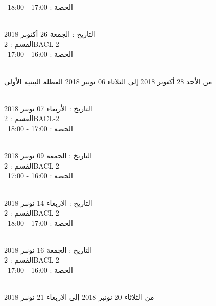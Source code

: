  \  
الحصة : 17:00 - 18:00 \\
\par
\noindent\makebox[\linewidth]{\rule{\paperwidth}{0.4pt}}
 \\
التاريخ : الجمعة 26 أكتوبر 2018 \\
القسم : 2BACL-2 \\
 \  
الحصة : 16:00 - 17:00 \\
\par
\noindent\makebox[\linewidth]{\rule{\paperwidth}{0.4pt}}
 \\
من الأحد 28 أكتوبر 2018 إلى الثلاثاء 06 نونبر 2018
\newline
\indent
 العطلة البينية الأولى
\par
\noindent\makebox[\linewidth]{\rule{\paperwidth}{0.4pt}}
 \\
التاريخ : الأربعاء 07 نونبر 2018 \\
القسم : 2BACL-2 \\
 \  
الحصة : 17:00 - 18:00 \\
\par
\noindent\makebox[\linewidth]{\rule{\paperwidth}{0.4pt}}
 \\
التاريخ : الجمعة 09 نونبر 2018 \\
القسم : 2BACL-2 \\
 \  
الحصة : 16:00 - 17:00 \\
\par
\noindent\makebox[\linewidth]{\rule{\paperwidth}{0.4pt}}
 \\
التاريخ : الأربعاء 14 نونبر 2018 \\
القسم : 2BACL-2 \\
 \  
الحصة : 17:00 - 18:00 \\
\par
\noindent\makebox[\linewidth]{\rule{\paperwidth}{0.4pt}}
 \\
التاريخ : الجمعة 16 نونبر 2018 \\
القسم : 2BACL-2 \\
 \  
الحصة : 16:00 - 17:00 \\
\par
\noindent\makebox[\linewidth]{\rule{\paperwidth}{0.4pt}}
 \\
من الثلاثاء 20 نونبر 2018 إلى الأربعاء 21 نونبر 2018
\newline
